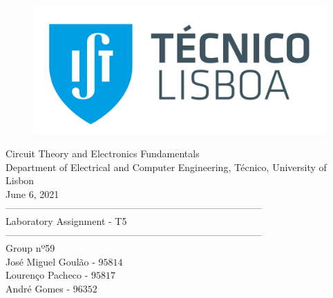 
\thispagestyle {empty}


\begin{figure}[ht]
	\centering
	\includegraphics[width = 0.5\linewidth]{ist_foto}
\end{figure}


\begin{center}

	\vspace{2cm}
	{\FontLb Circuit Theory and Electronics Fundamentals} \\

	\vspace{0.5cm}
	{\FontSn Department of Electrical and Computer Engineering, Técnico, University of Lisbon} \\

	\vspace{0.5cm}
	{\FontSn June 6, 2021} \\

	\vspace{1cm}
	{\FontLb --------------------------------------------------------------------------------} \\
	\vspace{0.1cm}
	{\FontLb Laboratory Assignment - T5} \\
	{\FontLb --------------------------------------------------------------------------------} \\

	\vspace{1cm}
	{\FontMb Group nº59} \\
	\vspace{0.25cm}
	{\FontSn José Miguel Goulão - $95814$} \\
	{\FontSn Lourenço Pacheco - $95817$} \\
	{\FontSn André Gomes - $96352$} \\

	\vspace{.5cm}

\end{center}

